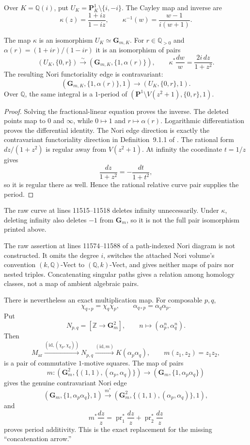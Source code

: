 Over $K=\mathbb Q(i)$, put
$U_K=\mathbf P^1_K\setminus\{i,-i\}$.  The Cayley map and inverse are
\[
 \kappa(z)=\frac{1+iz}{1-iz},
 \qquad
 \kappa^{-1}(w)=\frac{w-1}{i(w+1)}.
\]

\begin{proposition}
\label{prop:critical-cayley-nori-repair}
The map $\kappa$ is an isomorphism $U_K\simeq\mathbf G_{m,K}$.  For
$r\in\mathbb Q_{>0}$ and $\alpha(r)=(1+ir)/(1-ir)$ it is an isomorphism of
pairs
\[
 (U_K,\{0,r\})\overset\sim\longrightarrow
 (\mathbf G_{m,K},\{1,\alpha(r)\}),
 \qquad
 \kappa^*\frac{dw}{w}=\frac{2i\,dz}{1+z^2}.
\]
The resulting Nori functoriality edge is contravariant:
\[
 (\mathbf G_{m,K},\{1,\alpha(r)\},1)\longrightarrow
 (U_K,\{0,r\},1).
\]
Over $\mathbb Q$, the same integral is a $1$-period of
$(\mathbf P^1\setminus V(z^2+1),\{0,r\},1)$.
\end{proposition}

\begin{proof}
Solving the fractional-linear equation proves the inverse.  The deleted
points map to $0$ and $\infty$, while $0\mapsto1$ and
$r\mapsto\alpha(r)$.  Logarithmic differentiation proves the differential
identity.  The Nori edge direction is exactly the contravariant
functoriality direction in Definition~9.1.1 of
\cite{HuberMullerStach2025}.  The rational form $dz/(1+z^2)$ is regular away
from $V(z^2+1)$.  At infinity the coordinate $t=1/z$ gives
\[
 \frac{dz}{1+z^2}=-\frac{dt}{1+t^2},
\]
so it is regular there as well.  Hence the rational relative curve pair
supplies the period.
\end{proof}

The raw curve at lines 11515--11518 deletes infinity unnecessarily.  Under
$\kappa$, deleting infinity also deletes $-1$ from $\mathbf G_m$, so it is
not the full pair isomorphism printed above.

The raw assertion at lines 11574--11588 of a path-indexed Nori diagram is
not constructed.  It omits the degree $i$, switches the attached Nori
volume's convention $(k,\mathbb Q)$-Vect to $(\mathbb Q,k)$-Vect, and gives
neither maps of pairs nor nested triples.  Concatenating singular paths gives
a relation among homology classes, not a map of ambient algebraic pairs.

There is nevertheless an exact multiplication map.  For composable $p,q$,
\[
 \chi_{q\circ p}=\chi_q\chi_p,\qquad
 \alpha_{q\circ p}=\alpha_q\alpha_p.
\]
Put
\[
 N_{p,q}=[\mathbb Z\to\mathbf G_m^2],\qquad
 n\mapsto(\alpha_p^n,\alpha_q^n).
\]
Then
\[
 M_{\mathrm{ar}}
 \xrightarrow{(\mathrm{id},(\chi_p,\chi_q))}N_{p,q}
 \xrightarrow{(\mathrm{id},m)}K(\alpha_p\alpha_q),\qquad
 m(z_1,z_2)=z_1z_2,
\]
is a pair of commutative $1$-motive squares.  The map of pairs
\[
 m:(\mathbf G_m^2,\{(1,1),(\alpha_p,\alpha_q)\})
 \to(\mathbf G_m,\{1,\alpha_p\alpha_q\})
\]
gives the genuine contravariant Nori edge
\[
 (\mathbf G_m,\{1,\alpha_p\alpha_q\},1)
 \xrightarrow{m^*}
 (\mathbf G_m^2,\{(1,1),(\alpha_p,\alpha_q)\},1),
\]
and
\[
 m^*\frac{dz}{z}=\operatorname{pr}_1^*\frac{dz}{z}
 +\operatorname{pr}_2^*\frac{dz}{z}
\]
proves period additivity.  This is the exact replacement for the missing
``concatenation arrow.''

